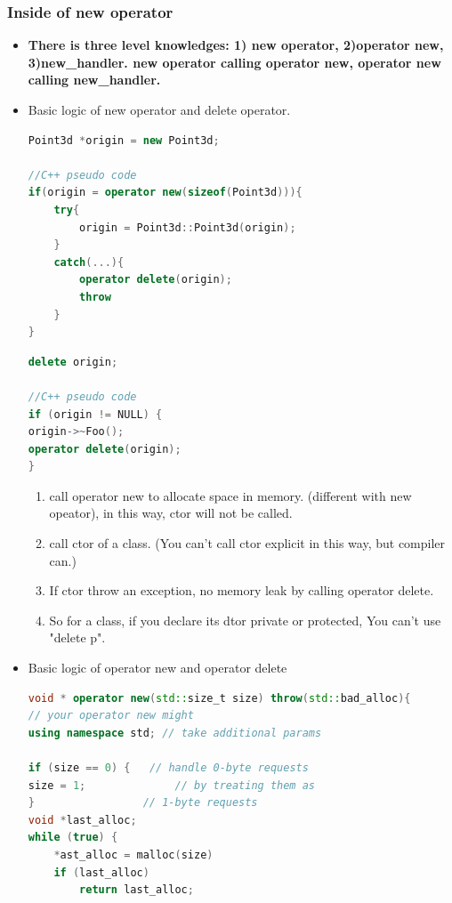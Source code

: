 \documentclass[a4paper,12pt,twoside]{book}
\begin{document}
\subsubsection{Inside of new operator}
\begin{itemize}
\item \textbf{There is three level knowledges: 1) new operator, 2)operator new, 3)new\_handler. new operator calling operator new, operator new calling new\_handler.} 

\item Basic logic of new operator and delete operator.
\begin{lstlisting}[frame=single, language=c++]
Point3d *origin = new Point3d;

//C++ pseudo code
if(origin = operator new(sizeof(Point3d))){
	try{
		origin = Point3d::Point3d(origin);
	}
	catch(...){
		operator delete(origin);
		throw
	}
}
\end{lstlisting}

\begin{lstlisting}[frame=single, language=c++]
delete origin;

//C++ pseudo code
if (origin != NULL) {
origin->~Foo();
operator delete(origin);
}
\end{lstlisting}

\begin{enumerate}
\item call operator new to allocate space in memory. (different with new opeator), in this way, ctor will not be called.
\item call ctor of a class. (You can't call ctor explicit in this way, but compiler can.)
\item If ctor throw an exception, no memory leak by calling operator delete.

\item So for a class, if you declare its dtor private or protected, You can't use "delete p".
\end{enumerate}


\item Basic logic of operator new and operator delete
\begin{lstlisting}[frame=single, language=c++]
void * operator new(std::size_t size) throw(std::bad_alloc){                      
// your operator new might
using namespace std; // take additional params

if (size == 0) {   // handle 0-byte requests
size = 1;              // by treating them as
}                 // 1-byte requests
void *last_alloc;
while (true) {
	*ast_alloc = malloc(size)
	if (last_alloc)
		return last_alloc;


\end{lstlisting}
\end{itemize}
\end{document}
